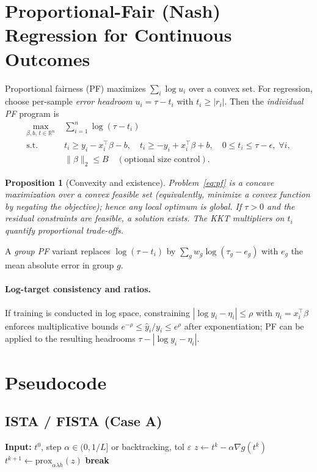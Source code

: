 \documentclass[11pt]{article}
\theoremstyle{plain}
\newtheorem{proposition}{Proposition}
\theoremstyle{definition}
\newcommand{\R}{\mathbb{R}}
\newcommand{\prox}{\mathrm{prox}}
\newcommand{\norm}[1]{\left\lVert #1 \right\rVert}
\newcommand{\1}{\mathbf{1}}
\begin{document}
\section{Proportional-Fair (Nash) Regression for Continuous Outcomes}
Proportional fairness (PF) maximizes $\sum_i \log u_i$ over a convex set. For regression, choose per-sample \emph{error headroom} $u_i=\tau - t_i$ with $t_i\ge |r_i|$. Then the \emph{individual PF} program is
\begin{align}
 \max_{\beta,b,\,t\in\R^n}\; &\sum_{i=1}^n \log(\tau - t_i) \label{eq:pf}\quad\\
 \text{s.t. }\; & t_i \ge y_i - x_i^\top\beta - b,\quad t_i \ge -y_i + x_i^\top\beta + b,\quad 0\le t_i \le \tau-\epsilon,\; \forall i,\\
 & \|\beta\|_2 \le B \quad (\text{optional size control}).\nonumber
\end{align}
\begin{proposition}[Convexity and existence]
Problem~\eqref{eq:pf} is a concave maximization over a convex feasible set (equivalently, minimize a convex function by negating the objective); hence any local optimum is global. If $\tau>0$ and the residual constraints are feasible, a solution exists. The KKT multipliers on $t_i$ quantify \emph{proportional} trade-offs.
\end{proposition}
A \emph{group PF} variant replaces $\log(\tau - t_i)$ by $\sum_g w_g \log(\tau_g - e_g)$ with $e_g$ the mean absolute error in group $g$.

\paragraph{Log-target consistency and ratios.} If training is conducted in log space, constraining $|\log y_i - \eta_i|\le \rho$ with $\eta_i=x_i^\top\beta$ enforces multiplicative bounds $e^{-\rho}\le \hat y_i/y_i\le e^{\rho}$ after exponentiation; PF can be applied to the resulting headrooms $\tau-\!|\log y_i-\eta_i|$.

\section{Pseudocode}
\subsection{ISTA / FISTA (Case A)}
\begin{algorithm}[H]
\caption{ISTA for $F_\lambda(t)=g(t)+\lambda h(t)$}
\begin{algorithmic}[1]
\State \textbf{Input:} $t^0$, step $\alpha\in(0,1/L]$ or backtracking, tol $\varepsilon$
  \State $z \gets t^k - \alpha \nabla g(t^k)$
  \State $t^{k+1} \gets \prox_{\alpha\lambda h}(z)$
  \If{$\frac{1}{\alpha}\norm{t^{k+1}-t^k}\le \varepsilon$} \textbf{break} \EndIf
\EndFor
\end{algorithmic}
\end{algorithm}
\end{document}
